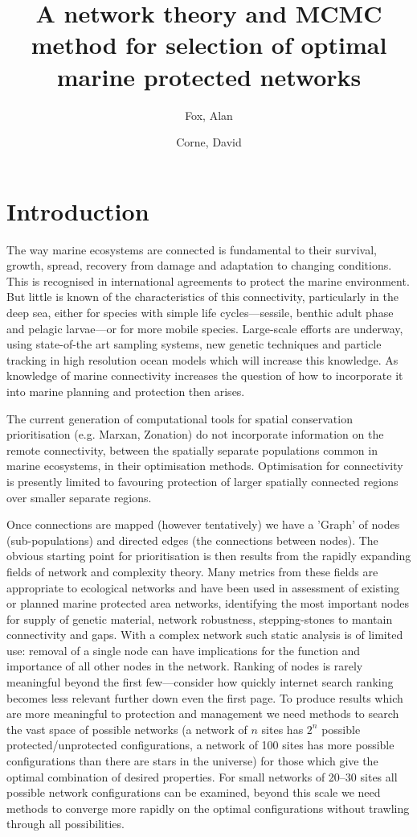 \documentclass[11pt]{article} %
\title{A network theory and MCMC method for selection of optimal marine protected networks}
\author{Fox, Alan \and Corne, David}
\begin{document}
\maketitle

\section{Introduction}

The way marine ecosystems are connected is fundamental to their survival, growth, spread, recovery from damage and adaptation to changing conditions. This is recognised in international agreements to protect the marine environment. But little is known of the characteristics of this connectivity, particularly in the deep sea, either for species with simple life cycles---sessile, benthic adult phase and pelagic larvae---or for more mobile species. Large-scale efforts are underway, using state-of-the art sampling systems, new genetic techniques and particle tracking in high resolution ocean models which will increase this knowledge. As knowledge of marine connectivity increases the question of how to incorporate it into marine planning and protection then arises. 

The current generation of computational tools for spatial conservation prioritisation (e.g. Marxan, Zonation) do not incorporate information on the remote connectivity, between the spatially separate populations common in marine ecosystems, in their optimisation methods. Optimisation for connectivity is presently limited to favouring protection of larger spatially connected regions over smaller separate regions.

Once connections are mapped (however tentatively) we have a 'Graph' of nodes (sub-populations) and directed edges (the connections between nodes). The obvious starting point for prioritisation is then results from the rapidly expanding fields of network and complexity theory. Many metrics from these fields are appropriate to ecological networks and have been used in assessment of existing or planned marine protected area networks, identifying the most important nodes for supply of genetic material, network robustness, stepping-stones to mantain connectivity and gaps. With a complex network such static analysis is of limited use: removal of a single node can have implications for the function and importance of all other nodes in the network. Ranking of nodes is rarely meaningful beyond the first few---consider how quickly internet search ranking becomes less relevant further down even the first page. To produce results which are more meaningful to protection and management we need methods to search the vast space of possible networks (a network of $n$ sites has $2^n$ possible protected/unprotected configurations, a network of 100 sites has more possible configurations than there are stars in the universe) for those which give the optimal combination of desired properties. For small networks of 20--30 sites all possible network configurations can be examined, beyond this scale we need methods to converge more rapidly on the optimal configurations without trawling through all possibilities.
\end{document}
